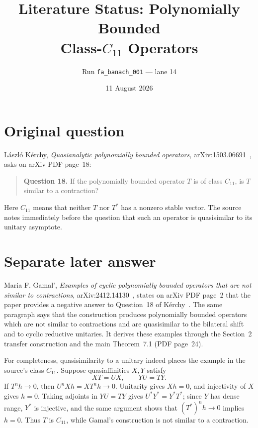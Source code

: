 \documentclass[11pt]{article}
\title{Literature Status: Polynomially Bounded\\
Class-$C_{11}$ Operators}
\author{Run \texttt{fa\_banach\_001} --- lane 14}
\date{11 August 2026}
\begin{document}
\maketitle

\begin{center}
\end{center}

\section{Original question}

L\'aszl\'o K\'erchy, \emph{Quasianalytic polynomially bounded operators},
arXiv:1503.06691~\cite{source}, asks on arXiv PDF page~18:
\begin{quote}
\textbf{Question 18.} If the polynomially bounded operator $T$ is of class
$C_{11}$, is $T$ similar to a contraction?
\end{quote}
Here $C_{11}$ means that neither $T$ nor $T^*$ has a nonzero stable vector.
The source notes immediately before the question that such an operator is
quasisimilar to its unitary asymptote.

\section{Separate later answer}

Maria F. Gamal', \emph{Examples of cyclic polynomially bounded operators that
are not similar to contractions}, arXiv:2412.14130~\cite{answerpaper}, states
on arXiv PDF page~2 that the paper provides a negative answer to Question~18
of K\'erchy~\cite{source}.  The same paragraph says that the construction
produces polynomially bounded operators which are not similar to contractions
and are quasisimilar to the bilateral shift and to cyclic reductive unitaries.
It derives these examples through the Section~2 transfer construction and the
main Theorem~7.1 (PDF page~24).

For completeness, quasisimilarity to a unitary indeed places the example in
the source's class $C_{11}$.  Suppose quasiaffinities $X,Y$ satisfy
\[
 XT=UX,\qquad YU=TY.
\]
If $T^nh\to0$, then $U^nXh=XT^nh\to0$.  Unitarity gives $Xh=0$, and
injectivity of $X$ gives $h=0$.  Taking adjoints in $YU=TY$ gives
$U^*Y^*=Y^*T^*$; since $Y$ has dense range, $Y^*$ is injective, and the same
argument shows that $(T^*)^nh\to0$ implies $h=0$.  Thus $T$ is $C_{11}$,
while Gamal's construction is not similar to a contraction.
\end{document}

